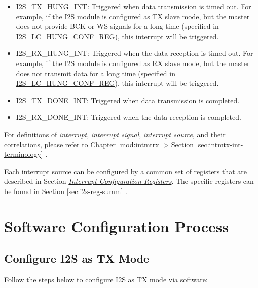 \documentclass[main\_\_EN.tex]{subfiles}
\begin{document}
\begin{itemize}
\item \label{int:I2STXHUNGINT}I2S\_TX\_HUNG\_INT: Triggered when data transmission is timed out. For example, if the I2S module is configured as TX slave mode, but the master does not provide BCK or WS signals for a long time (specified in \hyperref[regdesc:I2SLCHUNGCONFREG]{I2S\_LC\_HUNG\_CONF\_REG}), this interrupt will be triggered.
\item \label{int:I2SRXHUNGINT}I2S\_RX\_HUNG\_INT: Triggered when the data reception is timed out. For example, if the I2S module is configured as RX slave mode, but the master does not transmit data for a long time (specified in \hyperref[regdesc:I2SLCHUNGCONFREG]{I2S\_LC\_HUNG\_CONF\_REG}), this interrupt will be triggered.
\item \label{int:I2STXDONEINT}I2S\_TX\_DONE\_INT: Triggered when data transmission is completed.
\item \label{int:I2SRXDONEINT}I2S\_RX\_DONE\_INT: Triggered when the data reception is completed.
\end{itemize}

\begin{tiplisting}
    For definitions of \textit{interrupt}, \textit{interrupt signal}, \textit{interrupt source}, and their correlations, please refer to Chapter \ref{mod:intmtrx} \textit{} > Section \ref{sec:intmtx-int-terminology} \textit{}.
\end{tiplisting}

Each interrupt source can be configured by a common set of registers that are described in Section \hyperref[interrupt-config-registers]{\textit{Interrupt Configuration Registers}}. The specific registers can be found in Section \ref{sec:i2s-reg-summ} \textit{}.

\section{Software Configuration Process}
\subsection{Configure I2S as TX Mode}\label{sec:i2s-configure-i2s-tx-mode}
Follow the steps below to configure I2S as TX mode via software:
\end{document}
